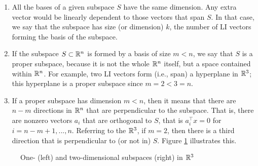 \begin{enumerate}
	\item All the bases of a given subspace $S$ have the same dimension. Any extra vector would be linearly dependent to those vectors that span $S$. In that case, we say that the subspace has size (or dimension) $k$, the number of LI vectors forming the basis of the subspace.
	\item If the subspace $S \subset \mathbb{R}^n$ is formed by a basis of size $m < n$, we say that $S$ is a proper subspace, because it is not the whole $\mathbb{R}^n$ itself, but a space contained within $\mathbb{R}^n$. For example, two LI vectors form (i.e., span) a hyperplane in $\mathbb{R}^3$; this hyperplane is a proper subspace since $m=2 <3=n$.
	\item If a proper subspace has dimension $m < n$, then it means that there are $n-m$ directions in $\mathbb{R}^n$ that are perpendicular to the subspace. That is, there are nonzero vectors $a_i$ that are orthogonal to $S$, that is $a_i^\top x = 0$ for $i = n-m + 1, ..., n$. Referring to the $\mathbb{R}^3$, if $m=2$, then there is a third direction that is perpendicular to (or not in) $S$. Figure \ref{p1c2:fig:proper_subpaces} illustrates this.
\end{enumerate}

\begin{figure}
	\centering
	\vspace{-12pt}
	\caption{One- (left) and two-dimensional subspaces (right) in $\mathbb{R}^3$} \label{p1c2:fig:proper_subpaces}
\end{figure}

